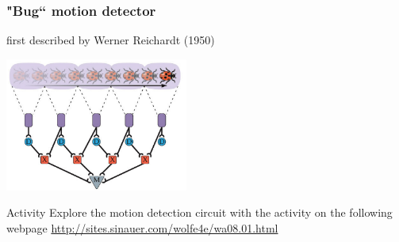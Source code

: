 \documentclass[]{beamer}
\begin{document}
\begin{frame}
 \frametitle{"Bug`` motion detector}
\begin{overlayarea}{130mm}{70mm}
first described by Werner Reichardt (1950)
 \begin{center}
\includegraphics[width=60mm]{figs/l7/reichardt_detector_manycells.png}
 \end{center}
\end{overlayarea}
\end{frame}



\begin{frame}
\begin{block}{Activity}
Explore the motion detection circuit with the activity on the following webpage \url{http://sites.sinauer.com/wolfe4e/wa08.01.html}
\end{block}
\end{frame}
\end{document}
